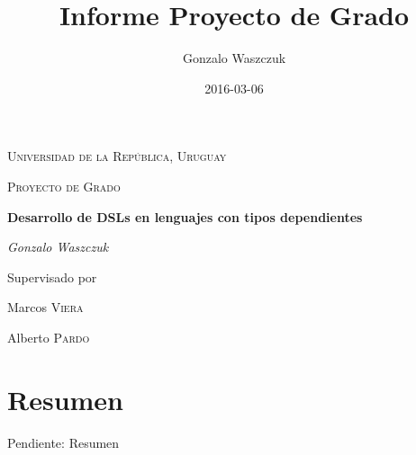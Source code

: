 \documentclass[a4paper,oneside,openany,spanish]{book}
\title{Informe Proyecto de Grado}
\author{Gonzalo Waszczuk}
\begin{document}
\frontmatter

\begin{titlepage}
	\centering
	{\scshape\LARGE Universidad de la República, Uruguay \par}
	\vspace{1cm}
	{\scshape\Large Proyecto de Grado\par}
	\vspace{1.5cm}
	{\huge\bfseries Desarrollo de DSLs en lenguajes con tipos dependientes\par}
	\vspace{2cm}
	{\Large\itshape Gonzalo Waszczuk\par}
	\vfill
	Supervisado por\par
	Marcos \textsc{Viera}\par
        Alberto \textsc{Pardo}
	\vfill

	{\large \date{2016-03-06}\par}
\end{titlepage}

\chapter*{Resumen}

Pendiente: Resumen

\tableofcontents


\mainmatter

\cleardoublepage

















\backmatter


\printbibliography

\end{document}
